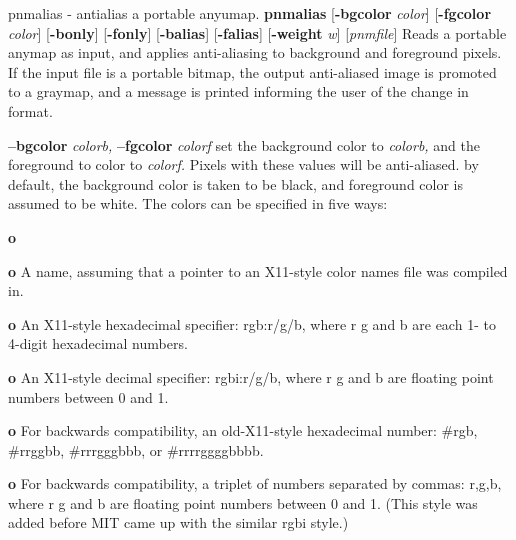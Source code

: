 %

\newpage
%

pnmalias - antialias a portable anyumap.
{\bf pnmalias}
{\rm [}{\bf -bgcolor}
{\it color}{\rm ]}
{\rm [}{\bf -fgcolor}
{\it color}{\rm ]}
{\rm [}{\bf -bonly}{\rm ]}
{\rm [}{\bf -fonly}{\rm ]}
{\rm [}{\bf -balias}{\rm ]}
{\rm [}{\bf -falias}{\rm ]}
{\rm [}{\bf -weight}
{\it w}{\rm ]}
{\rm [}{\it pnmfile}{\rm ]}
Reads a portable anymap as input, and applies anti-aliasing to background and
foreground pixels.
If the input file is a portable bitmap, the 
output anti-aliased image is promoted to a graymap, and a message is printed
informing the user of the change in format.
\par
{\bf --bgcolor}
{\it colorb,}
{\bf --fgcolor}
{\it colorf}
set the background color to 
{\it colorb,}
and the foreground to color to
{\it colorf.}
Pixels with these values will be anti-aliased. by default,
the background color is taken to be black, and foreground color
is assumed to be white.  
The colors can be specified in five ways:
\begin{TPlist}{{\bf o}}
\item[{{\bf o}}]
A name, assuming
that a pointer to an X11-style color names file was compiled in.
\item[{{\bf o}}]
An X11-style hexadecimal specifier: rgb:r/g/b, where r g and b are
each 1- to 4-digit hexadecimal numbers.
\item[{{\bf o}}]
An X11-style decimal specifier: rgbi:r/g/b, where r g and b are
floating point numbers between 0 and 1.
\item[{{\bf o}}]
For backwards compatibility, an old-X11-style hexadecimal
number: \#rgb, \#rrggbb, \#rrrgggbbb, or \#rrrrggggbbbb.
\item[{{\bf o}}]
For backwards compatibility, a triplet of numbers
separated by commas: r,g,b, where r g and b are
floating point numbers between 0 and 1.
(This style was added before MIT came up with the similar rgbi style.)
\end{TPlist}
